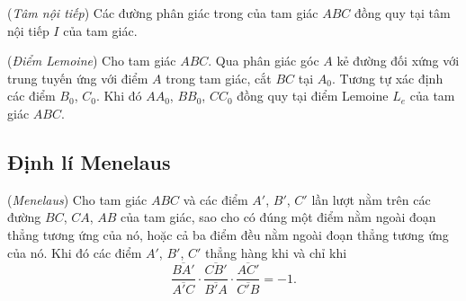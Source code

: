 \documentclass{article} %
\begin{document}
        \begin{corollary}
            (\textit{Tâm nội tiếp}) Các đường phân giác trong của tam giác \(ABC\) đồng quy tại tâm nội tiếp \(I\) của tam giác.
        \end{corollary}

        \begin{corollary}
            (\textit{Điểm Lemoine}) Cho tam giác \(ABC\). Qua phân giác góc \(A\) kẻ đường đối xứng với trung tuyến ứng với điểm \(A\) trong tam giác, cắt \(BC\) tại \(A_0\). Tương tự xác định các điểm \(B_0\), \(C_0\). Khi đó \(AA_0\), \(BB_0\), \(CC_0\) đồng quy tại điểm Lemoine \(L_e\) của tam giác \(ABC\).
        \end{corollary}

    \subsection{Định lí Menelaus}

        \begin{theorem}
            (\textit{Menelaus}) Cho tam giác \(ABC\) và các điểm \(A'\), \(B'\), \(C'\) lần lượt nằm trên các đường \(BC\), \(CA\), \(AB\) của tam giác, sao cho có đúng một điểm nằm ngoài đoạn thẳng tương ứng của nó, hoặc cả ba điểm đều nằm ngoài đoạn thẳng tương ứng của nó. Khi đó các điểm \(A'\), \(B'\), \(C'\) thẳng hàng khi và chỉ khi
            \[\frac{\overline{BA'}}{\overline{A'C}} \cdot \frac{\overline{CB'}}{\overline{B'A}} \cdot \frac{\overline{AC'}}{\overline{C'B}} = -1.\]
        \end{theorem}
\end{document}
